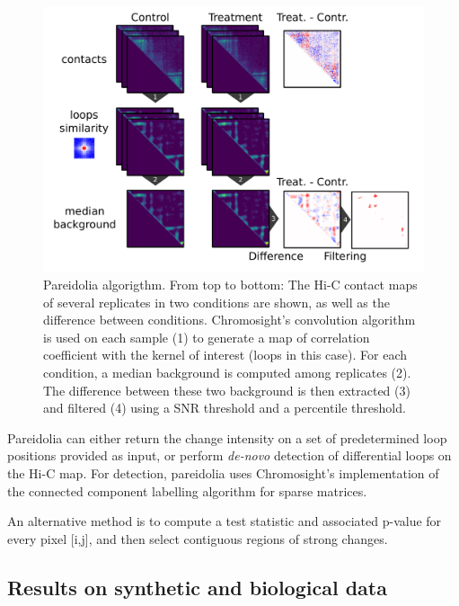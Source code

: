 \begin{figure}[htb]
    \includegraphics[width=\textwidth]{Parts/Part02/gfx/pareidolia_process.pdf}
    \caption{Pareidolia algorigthm. From top to bottom: The Hi-C contact maps of several replicates in two conditions are shown, as well as the difference between conditions. Chromosight's convolution algorithm is used on each sample (1) to generate a map of correlation coefficient with the kernel of interest (loops in this case). For each condition, a median background is computed among replicates (2). The difference between these two background is then extracted (3) and filtered (4) using a \acrshort{SNR} threshold and a percentile threshold.}
    \label{fig:02-01:pareidolia}
\end{figure}

Pareidolia can either return the change intensity on a set of predetermined loop positions provided as input, or perform \textit{de-novo} detection of differential loops on the Hi-C map. For detection, pareidolia uses Chromosight's implementation of the connected component labelling algorithm for sparse matrices.

An alternative method is to compute a test statistic and associated p-value for every pixel [i,j], and then select contiguous regions of strong changes.

\subsection{Results on synthetic and biological data}

